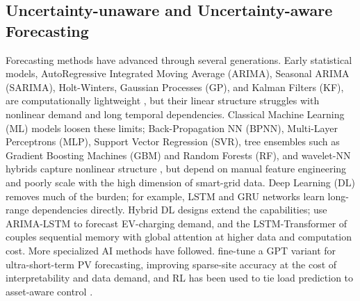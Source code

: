 \documentclass[final,10pt,1p,authoryear]{elsarticle}
\theoremstyle{definition}
\begin{document}
\subsection{Uncertainty-unaware and Uncertainty-aware Forecasting}
Forecasting methods have advanced through several generations. Early statistical models, AutoRegressive Integrated Moving Average (ARIMA), Seasonal ARIMA (SARIMA), Holt-Winters, Gaussian Processes (GP), and Kalman Filters (KF), are computationally lightweight \citet{ozdemir2024probabilistic}, but their linear structure struggles with nonlinear demand and long temporal dependencies. Classical Machine Learning (ML) models loosen these limits; Back-Propagation NN (BPNN), Multi-Layer Perceptrons (MLP), Support Vector Regression (SVR), tree ensembles such as Gradient Boosting Machines (GBM) and Random Forests (RF), and wavelet-NN hybrids capture nonlinear structure \citet{ozdemir2024long}, but depend on manual feature engineering and poorly scale with the high dimension of smart-grid data. Deep Learning (DL) removes much of the burden; for example, LSTM and GRU networks learn long-range dependencies directly. Hybrid DL designs extend the capabilities; \citet{el2025enhancing} use ARIMA-LSTM to forecast EV-charging demand, and the LSTM-Transformer of \citet{pentsos2025hybrid} couples sequential memory with global attention at higher data and computation cost. More specialized AI methods have followed. \citet{zhang2025ultra} fine-tune a GPT variant for ultra-short-term PV forecasting, improving sparse-site accuracy at the cost of interpretability and data demand, and RL has been used to tie load prediction to asset-aware control \citet{zhang2024load}.
\end{document}
